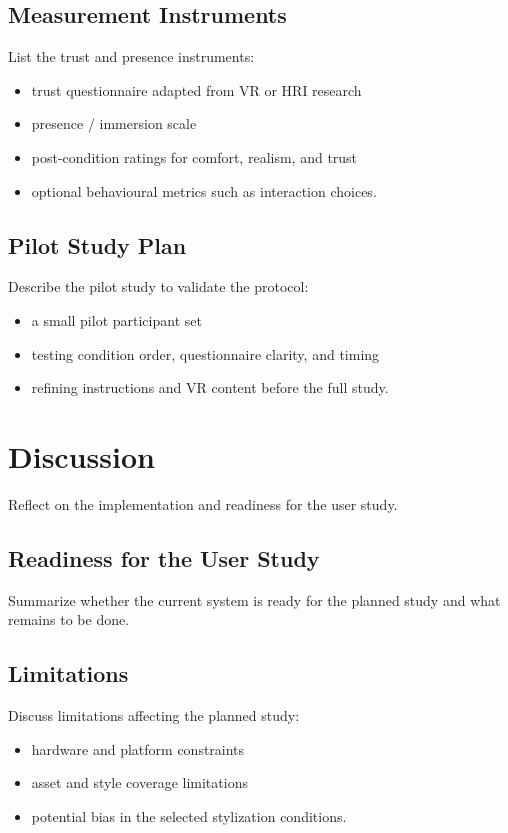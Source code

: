 \subsection{Measurement Instruments}

List the trust and presence instruments:
\begin{itemize}
  \item trust questionnaire adapted from VR or HRI research
  \item presence / immersion scale
  \item post-condition ratings for comfort, realism, and trust
  \item optional behavioural metrics such as interaction choices.
\end{itemize}

\subsection{Pilot Study Plan}

Describe the pilot study to validate the protocol:
\begin{itemize}
  \item a small pilot participant set
  \item testing condition order, questionnaire clarity, and timing
  \item refining instructions and VR content before the full study.
\end{itemize}

\section{Discussion}
\label{sec:discussion}

Reflect on the implementation and readiness for the user study.

\subsection{Readiness for the User Study}

Summarize whether the current system is ready for the planned study and what remains to be done.

\subsection{Limitations}

Discuss limitations affecting the planned study:
\begin{itemize}
  \item hardware and platform constraints
  \item asset and style coverage limitations
  \item potential bias in the selected stylization conditions.
\end{itemize}
